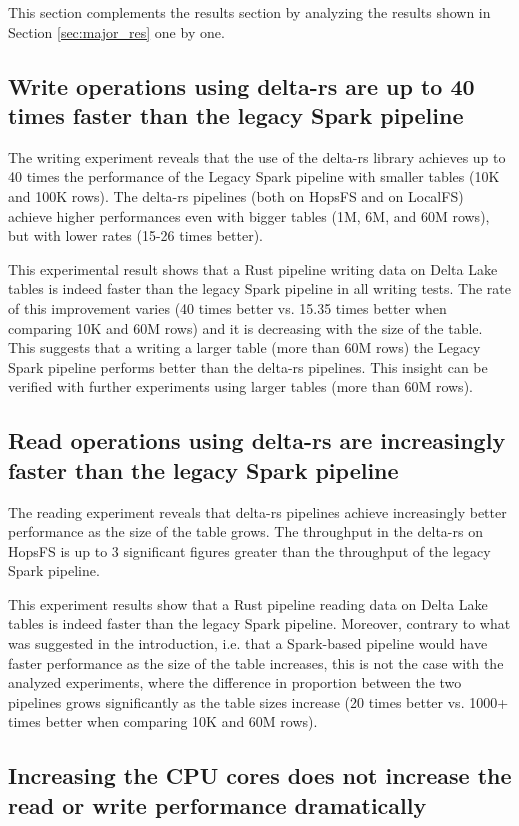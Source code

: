 This section complements the results section by analyzing the results shown in Section \ref{sec:major_res} one by one.

\subsection{Write operations using delta-rs are up to 40 times faster than the legacy Spark pipeline}
The writing experiment reveals that the use of the delta-rs library achieves up to 40 times the performance of the Legacy Spark pipeline with smaller tables (10K and 100K rows). The delta-rs pipelines (both on \gls{HopsFS} and on \gls{LocalFS}) achieve higher performances even with bigger tables (1M, 6M, and 60M rows), but with lower rates (15-26 times better). 

This experimental result shows that a Rust pipeline writing data on Delta Lake tables is indeed faster than the legacy Spark pipeline in all writing tests. The rate of this improvement varies (40 times better vs. 15.35 times better when comparing 10K and 60M rows) and it is decreasing with the size of the table. This suggests that a writing a larger table (more than 60M rows) the Legacy Spark pipeline performs better than the delta-rs pipelines. This insight can be verified with further experiments using larger tables (more than 60M rows).

\subsection{Read operations using delta-rs are increasingly faster than the legacy Spark pipeline}

The reading experiment reveals that delta-rs pipelines achieve increasingly better performance as the size of the table grows. The throughput in the delta-rs on \gls{HopsFS} is up to 3 significant figures greater than the throughput of the legacy Spark pipeline.

This experiment results show that a Rust pipeline reading data on Delta Lake tables is indeed faster than the legacy Spark pipeline. Moreover, contrary to what was suggested in the introduction, i.e. that a Spark-based pipeline would have faster performance as the size of the table increases, this is not the case with the analyzed experiments, where the difference in proportion between the two pipelines grows significantly as the table sizes increase (20 times better vs. 1000+ times better when comparing 10K and 60M rows).

\subsection{Increasing the CPU cores does not increase the read or write performance dramatically}

